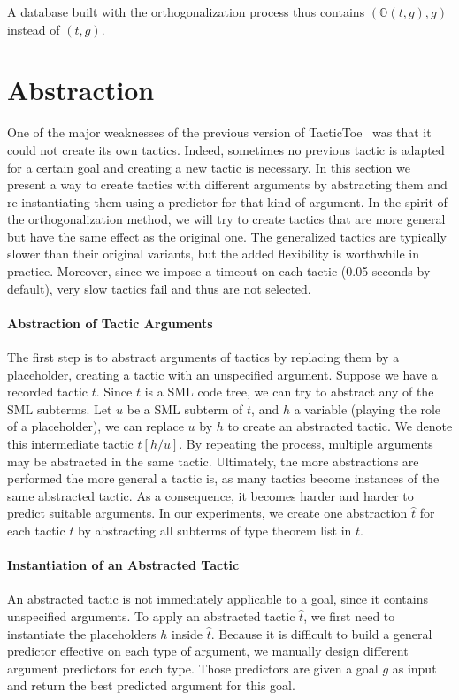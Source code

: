 \documentclass[runningheads,a4paper,draft]{svjour3}
\def\sml{\textsf{SML}\xspace}
\def\tactictoe{\textsf{TacticToe}\xspace}
\begin{document}
A database built with the orthogonalization process thus contains
$(\mathbb{O}(t,g),g)$ instead of $(t,g)$.

\section{Abstraction}\label{sec:synthesis}
One of the major weaknesses of the previous version of 
\tactictoe~\cite{tgckju-lpar17} was that
it could not create its own tactics. Indeed, sometimes no previous tactic is
adapted for a certain goal and creating a new tactic is necessary.
In this section we present a way to create tactics with different arguments
by abstracting them and re-instantiating them using a predictor for that kind
of argument. In the spirit of the orthogonalization method, we will try to
create tactics that are more general but have the same effect as the
original one. The generalized tactics are typically slower than their
original variants, but the added flexibility is worthwhile in practice. Moreover,
since we impose a timeout on each tactic (0.05 seconds by default), very slow
tactics fail and thus are not selected.

\paragraph{Abstraction of Tactic Arguments}
The first step is to abstract arguments of tactics by replacing them by a
placeholder, creating a tactic with an unspecified argument.
Suppose we have a recorded tactic $t$. Since $t$ is a \sml code tree, we can
try to abstract any of the
\sml subterms. Let $u$ be a \sml subterm of $t$, and $h$ a variable (playing
the role of a placeholder), we
can replace $u$ by $h$ to create an abstracted tactic.
We denote this intermediate tactic $t[h/u]$. By repeating the
process, multiple
arguments may be abstracted in the same tactic. Ultimately, the more
abstractions are performed the more general a tactic is, as many tactics
become instances of the same abstracted tactic. As a consequence, it becomes
harder and harder to predict suitable arguments. In our experiments, we create
one abstraction $\hat{t}$ for each tactic $t$ by abstracting all subterms of
type theorem list in $t$.

\paragraph{Instantiation of an Abstracted Tactic}
An abstracted tactic is not immediately applicable to a goal, since it contains
unspecified arguments. To apply an abstracted tactic $\hat{t}$, we first need
to
instantiate the placeholders $h$ inside $\hat{t}$. Because it is difficult to
build a general predictor effective on each type of argument, we manually
design different argument predictors for each type. Those predictors are
given a goal $g$ as input and return the best predicted argument for this
goal.
\end{document}
